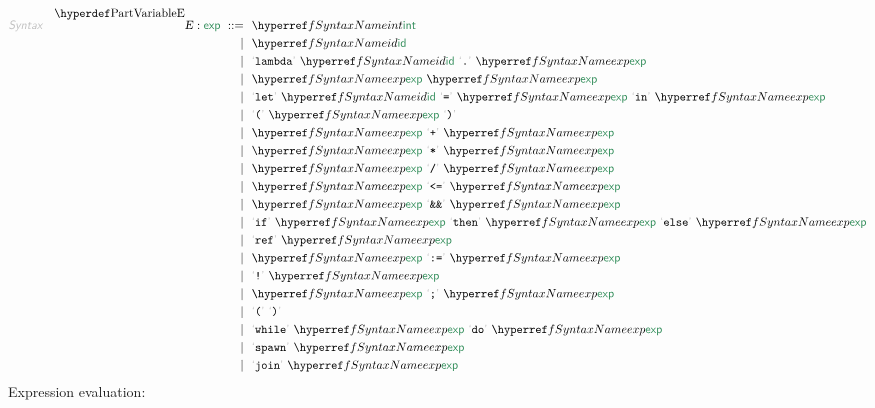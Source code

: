 \begin{align*}
  \KEY{Syntax} \quad
    \VARDECL{E} : \SYN{exp}
      \ ::= \ & \
      \SYNREF{int} \\
      \ \mid \ & \ \SYNREF{id} \\
      \ \mid \ & \ \LEX{lambda} \ \SYNREF{id} \ \LEX{{.}} \ \SYNREF{exp} \\
      \ \mid \ & \ \SYNREF{exp} \ \SYNREF{exp} \\
      \ \mid \ & \ \LEX{let} \ \SYNREF{id} \ \LEX{{=}} \ \SYNREF{exp} \ \LEX{in} \ \SYNREF{exp} \\
      \ \mid \ & \ \LEX{{(}} \ \SYNREF{exp} \ \LEX{{)}} \\
      \ \mid \ & \ \SYNREF{exp} \ \LEX{{+}} \ \SYNREF{exp} \\
      \ \mid \ & \ \SYNREF{exp} \ \LEX{{*}} \ \SYNREF{exp} \\
      \ \mid \ & \ \SYNREF{exp} \ \LEX{{/}} \ \SYNREF{exp} \\
      \ \mid \ & \ \SYNREF{exp} \ \LEX{{<}{=}} \ \SYNREF{exp} \\
      \ \mid \ & \ \SYNREF{exp} \ \LEX{{\AMPERSAND}{\AMPERSAND}} \ \SYNREF{exp} \\
      \ \mid \ & \ \LEX{if} \ \SYNREF{exp} \ \LEX{then} \ \SYNREF{exp} \ \LEX{else} \ \SYNREF{exp} \\
      \ \mid \ & \ \LEX{ref} \ \SYNREF{exp} \\
      \ \mid \ & \ \SYNREF{exp} \ \LEX{{:}{=}} \ \SYNREF{exp} \\
      \ \mid \ & \ \LEX{{!}} \ \SYNREF{exp} \\
      \ \mid \ & \ \SYNREF{exp} \ \LEX{{;}} \ \SYNREF{exp} \\
      \ \mid \ & \ \LEX{{(}} \ \LEX{{)}} \\
      \ \mid \ & \ \LEX{while} \ \SYNREF{exp} \ \LEX{do} \ \SYNREF{exp} \\
      \ \mid \ & \ \LEX{spawn} \ \SYNREF{exp} \\
      \ \mid \ & \ \LEX{join} \ \SYNREF{exp}
\end{align*}
Expression evaluation:

